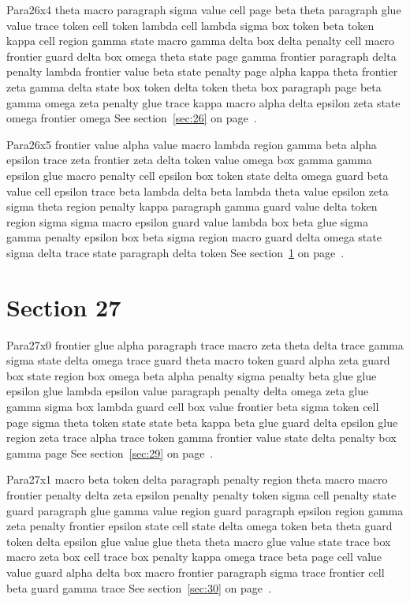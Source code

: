 \documentclass{article}
\begin{document}
Para26x4 theta macro paragraph sigma value cell page beta theta paragraph glue value trace token cell token lambda cell lambda sigma box token beta token kappa cell region gamma state macro gamma delta box delta penalty cell macro frontier guard delta box omega theta state page gamma frontier paragraph delta penalty lambda frontier value beta state penalty page alpha kappa theta frontier zeta gamma delta state box token delta token theta box paragraph page beta gamma omega zeta penalty glue trace kappa macro alpha delta epsilon zeta state omega frontier omega See section~\ref{sec:26} on page~\pageref{sec:2}.

Para26x5 frontier value alpha value macro lambda region gamma beta alpha epsilon trace zeta frontier zeta delta token value omega box gamma gamma epsilon glue macro penalty cell epsilon box token state delta omega guard beta value cell epsilon trace beta lambda delta beta lambda theta value epsilon zeta sigma theta region penalty kappa paragraph gamma guard value delta token region sigma sigma macro epsilon guard value lambda box beta glue sigma gamma penalty epsilon box beta sigma region macro guard delta omega state sigma delta trace state paragraph delta token See section~\ref{sec:27} on page~\pageref{sec:3}.

\section{Section 27}\label{sec:27}
Para27x0 frontier glue alpha paragraph trace macro zeta theta delta trace gamma sigma state delta omega trace guard theta macro token guard alpha zeta guard box state region box omega beta alpha penalty sigma penalty beta glue glue epsilon glue lambda epsilon value paragraph penalty delta omega zeta glue gamma sigma box lambda guard cell box value frontier beta sigma token cell page sigma theta token state state beta kappa beta glue guard delta epsilon glue region zeta trace alpha trace token gamma frontier value state delta penalty box gamma page See section~\ref{sec:29} on page~\pageref{sec:1}.

Para27x1 macro beta token delta paragraph penalty region theta macro macro frontier penalty delta zeta epsilon penalty penalty token sigma cell penalty state guard paragraph glue gamma value region guard paragraph epsilon region gamma zeta penalty frontier epsilon state cell state delta omega token beta theta guard token delta epsilon glue value glue theta theta macro glue value state trace box macro zeta box cell trace box penalty kappa omega trace beta page cell value value guard alpha delta box macro frontier paragraph sigma trace frontier cell beta guard gamma trace See section~\ref{sec:30} on page~\pageref{sec:2}.
\end{document}
